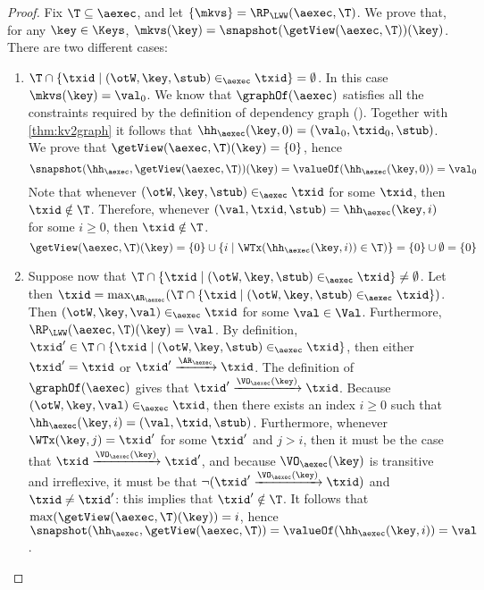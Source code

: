 \begin{proof}
Fix $\T \subseteq \aexec$, and let $\{\mkvs\} = \RP_{\LWW}(\aexec, \T)$. We prove that, for any $\key \in \Keys$, 
$\mkvs(\key) = \snapshot(\getView(\aexec, \T))(\key)$. There are two different cases: 
\begin{enumerate}
\item $\T \cap \{ \txid \mid (\otW, \key, \stub) \in_{\aexec} \txid \} = \emptyset$. 
In this case $\mkvs(\key) = \val_0$. 
We know that $\graphOf(\aexec)$ satisfies all the constraints required by the definition of dependency graph 
(\cite{laws}). Together with \cref{thm:kv2graph} it follows that $\hh_{\aexec}(\key, 0) = (\val_0, \txid_0, \stub)$.
We prove that $\getView(\aexec, \T)(\key) = \{0\}$, 
hence 
\[ 
\snapshot(\hh_{\aexec}, \getView(\aexec, \T))(\key) = \valueOf(\hh_{\aexec}(\key, 0)) = \val_{0}
\]
Note that whenever $(\otW, \key, \stub) \in_{\aexec} \txid$ for some $\txid$, then 
$\txid \notin \T$. Therefore, whenever $(\val, \txid, \stub) = \hh_{\aexec}(\key, i)$ for some $i \geq 0$, then 
$\txid \notin \T$.
\[
\getView(\aexec, \T)(\key) = \{0\} \cup \{i \mid \WTx(\hh_{\aexec}(\key, i)) \in \T)\} = \{0\} \cup \emptyset = \{0\}
\]
\item Suppose now that $\T \cap \{ \txid \mid (\otW, \key, \stub) \in_{\aexec} \txid \} \neq \emptyset$. 
Let then $\txid = \max_{\AR_{\aexec}}(\T \cap \{\txid \mid (\otW, \key, \stub) \in_{\aexec} \txid\})$. 
Then $(\otW, \key, \val) \in_{\aexec} \txid$ for some $\val \in \Val$. Furthermore, $\RP_{\LWW}(\aexec, \T)(\key) = \val$.
By definition, $\txid' \in \T \cap \{ \txid \mid (\otW, \key, \stub) \in_{\aexec} \txid\}$, 
then either $\txid' = \txid$ or $\txid' \xrightarrow{\AR_{\aexec}} \txid$. The definition of 
$\graphOf(\aexec)$ gives that $\txid' \xrightarrow{\VO_{\aexec}(\key)} \txid$. 
Because $(\otW, \key, \val) \in_{\aexec} \txid$, then there exists an index 
$i \geq 0$ such that $\hh_{\aexec}(\key, i) = (\val, \txid, \stub)$. Furthermore, 
whenever $\WTx(\key, j) = \txid'$ for some $\txid'$ and $j > i$, then it must 
be the case that $\txid \xrightarrow{\VO_{\aexec}(\key)} \txid'$, and because 
$\VO_{\aexec}(\key)$ is transitive and irreflexive, it must be that  
$\neg( \txid' \xrightarrow{\VO_{\aexec}(\key)} \txid)$ and $\txid \neq \txid'$: this implies that 
$\txid' \notin \T$. It follows that $\max(\getView(\aexec, \T)(\key)) = i$, hence 
$\snapshot(\hh_{\aexec}, \getView(\aexec, \T)) = \valueOf(\hh_{\aexec}(\key, i)) = \val$.
\end{enumerate}
\end{proof}

